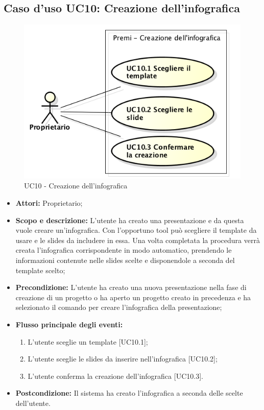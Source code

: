 \subsection{Caso d'uso UC10: Creazione dell'infografica}
\begin{figure}[h] 
	\centering 
	\includegraphics[scale=0.45] {img/UC10.png}
	\caption{UC10 - Creazione dell'infografica}
\end{figure}

\begin{itemize}
	\item \textbf{Attori:} Proprietario;
	\item \textbf{Scopo e descrizione:} L'utente ha creato una presentazione e da questa vuole creare un'\gls{infografica}. Con l'opportuno tool può scegliere il \gls{template} da usare e le \gls{slides} da includere in essa. Una volta completata la procedura verrà creata l'\gls{infografica} corrispondente in modo automatico, prendendo le informazioni contenute nelle \gls{slides} scelte e disponendole a seconda del \gls{template} scelto;
	\item \textbf{Precondizione:} L'utente ha creato una nuova presentazione nella fase di creazione di un progetto o ha aperto un progetto creato in precedenza e ha selezionato il comando per creare l'\gls{infografica} della presentazione;
	
	\item \textbf{Flusso principale degli eventi:}
	\begin{enumerate}
		\item L'utente sceglie un \gls{template} [UC10.1];
		\item L'utente sceglie le \gls{slides} da inserire nell'\gls{infografica} [UC10.2];
		\item L'utente conferma la creazione dell'\gls{infografica} [UC10.3].
	\end{enumerate}
	\item \textbf{Postcondizione:} Il sistema ha creato l'\gls{infografica} a seconda delle scelte dell'utente.
\end{itemize}


